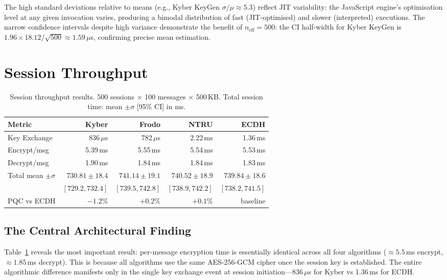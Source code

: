 \documentclass[12pt,a4paper]{report}
\begin{document}
The high standard deviations relative to means (e.g., Kyber KeyGen $\sigma/\mu \approx 5.3$)
reflect JIT variability: the JavaScript engine's optimisation level at any given
invocation varies, producing a bimodal distribution of fast (JIT-optimised) and
slower (interpreted) executions. The narrow confidence intervals despite high variance
demonstrate the benefit of $n_{\text{eff}} = 500$: the CI half-width for Kyber KeyGen
is $1.96 \times 18.12 / \sqrt{500} \approx 1.59\,\mu$s, confirming precise mean estimation.

\section{Session Throughput}

\begin{table}[H]
\centering
\caption{Session throughput results. 500 sessions $\times$ 100 messages $\times$ 500\,KB.
Total session time: mean $\pm \sigma$ [95\% CI] in ms.}
\label{tab:throughput}
\begin{tabular}{l|r|r|r|r}
\toprule
\textbf{Metric} & \textbf{Kyber} & \textbf{Frodo} & \textbf{NTRU} & \textbf{ECDH} \\
\midrule
Key Exchange & 836\,$\mu$s & 782\,$\mu$s & 2.22\,ms & 1.36\,ms \\
Encrypt/msg & 5.39\,ms & 5.55\,ms & 5.54\,ms & 5.53\,ms \\
Decrypt/msg & 1.90\,ms & 1.84\,ms & 1.84\,ms & 1.83\,ms \\
\midrule
Total mean $\pm \sigma$ & $\mathbf{730.81 \pm 18.4}$ & $741.14 \pm 19.1$ & $740.52 \pm 18.9$ & $739.84 \pm 18.6$ \\
\quad [95\% CI (ms)] & $\mathbf{[729.2, 732.4]}$ & $[739.5, 742.8]$ & $[738.9, 742.2]$ & $[738.2, 741.5]$ \\
PQC vs ECDH & $-1.2\%$ & $+0.2\%$ & $+0.1\%$ & baseline \\
\bottomrule
\end{tabular}
\end{table}

\subsection{The Central Architectural Finding}

Table~\ref{tab:throughput} reveals the most important result: per-message encryption
time is essentially identical across all four algorithms ($\approx 5.5$\,ms encrypt,
$\approx 1.85$\,ms decrypt). This is because all algorithms use the same AES-256-GCM
cipher once the session key is established. The entire algorithmic difference manifests
only in the single key exchange event at session initiation---836\,$\mu$s for Kyber
vs 1.36\,ms for ECDH.
\end{document}
